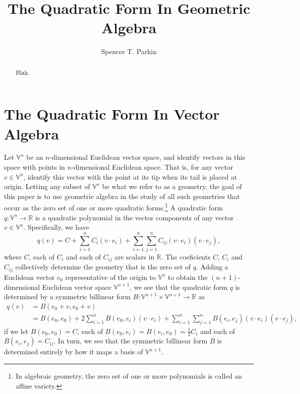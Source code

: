 \documentclass{birkjour}
\theoremstyle{definition}
\theoremstyle{remark}
\numberwithin{equation}{section}
\newcommand{\V}{\mathbb{V}}
\newcommand{\R}{\mathbb{R}}
\begin{document}
\title{The Quadratic Form In Geometric Algebra}

\author{Spencer T. Parkin}





\begin{abstract}
Blah.
\end{abstract}

\maketitle

\section{The Quadratic Form In Vector Algebra}

Let $\V^n$ be an $n$-dimensional Euclidean vector space, and identify vectors
in this space with points in $n$-dimensional Euclidean space.  That is,
for any vector $v\in\V^n$, identify this vector with the point at its tip when
its tail is placed at origin.  Letting any subset of $\V^n$ be what we refer to
as a geometry, the goal of this paper is to use geometric algebra in the study of all
such geometries that occur as the zero set of one or more quadratic forms.\footnote{In
algebraic geometry, the zero set of one or more polynomials is called an affine variety.}
A quadratic form $q:\V^n\to\R$ is a quadratic polynomial in the vector components of any
vector $v\in\V^n$.  Specifically, we have
\begin{equation}\label{equ_quadratic_form}
q(v) = C + \sum_{i=1}^n C_i(v\cdot e_i) + \sum_{i=1}^n\sum_{j=1}^n C_{ij}(v\cdot e_i)(v\cdot e_j),
\end{equation}
where $C$, each of $C_i$ and each of $C_{ij}$ are scalars in $\R$.  The coeficients $C$, $C_i$ and $C_{ij}$ collectively determine the geometry that is the zero set of $q$.  Adding a Euclidean vector $e_0$
representative of the origin to $\V^n$ to obtain the $(n+1)$-dimensional Euclidean
vector space $\V^{n+1}$, we see that the quadratic form $q$ is determined by a
symmetric billinear form $B:\V^{n+1}\times\V^{n+1}\to\R$ as
\begin{align}
q(v) &= B(e_0+v,e_0+v) \\
 &= B(e_0,e_0)+2\sum_{i=1}^n B(e_0,e_i)(v\cdot e_i)
 + \sum_{i=1}^n\sum_{j=1}^n B(e_i,e_j)(v\cdot e_i)(v\cdot e_j),
\end{align}
if we let $B(e_0,e_0)=C$, each of $B(e_0,e_i)=B(e_i,e_0)=\frac{1}{2}C_i$ and each of
$B(e_i,e_j)=C_{ij}$.
In turn, we see that the symmetric billinear form $B$ is determined entirely by how it
maps a basis of $\V^{n+1}$.
\end{document}
